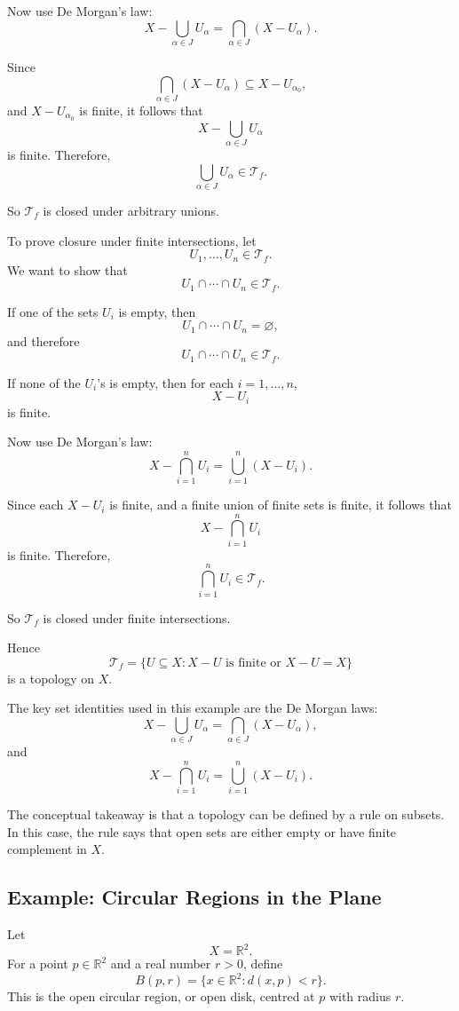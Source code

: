 \documentclass{article}
\begin{document}
	Now use De Morgan's law:
	\[
	X-\bigcup_{\alpha\in J}U_\alpha
	=
	\bigcap_{\alpha\in J}(X-U_\alpha).
	\]
	
	Since
	\[
	\bigcap_{\alpha\in J}(X-U_\alpha)
	\subseteq
	X-U_{\alpha_0},
	\]
	and \(X-U_{\alpha_0}\) is finite, it follows that
	\[
	X-\bigcup_{\alpha\in J}U_\alpha
	\]
	is finite. Therefore,
	\[
	\bigcup_{\alpha\in J}U_\alpha\in\mathcal T_f.
	\]
	
	So \(\mathcal T_f\) is closed under arbitrary unions.
	
	To prove closure under finite intersections, let
	\[
	U_1,\dots,U_n\in\mathcal T_f.
	\]
	We want to show that
	\[
	U_1\cap\cdots\cap U_n\in\mathcal T_f.
	\]
	
	If one of the sets \(U_i\) is empty, then
	\[
	U_1\cap\cdots\cap U_n=\varnothing,
	\]
	and therefore
	\[
	U_1\cap\cdots\cap U_n\in\mathcal T_f.
	\]
	
	If none of the \(U_i\)'s is empty, then for each \(i=1,\dots,n\),
	\[
	X-U_i
	\]
	is finite.
	
	Now use De Morgan's law:
	\[
	X-\bigcap_{i=1}^{n}U_i
	=
	\bigcup_{i=1}^{n}(X-U_i).
	\]
	
	Since each \(X-U_i\) is finite, and a finite union of finite sets is finite, it follows that
	\[
	X-\bigcap_{i=1}^{n}U_i
	\]
	is finite. Therefore,
	\[
	\bigcap_{i=1}^{n}U_i\in\mathcal T_f.
	\]
	
	So \(\mathcal T_f\) is closed under finite intersections.
	
	Hence
	\[
	\mathcal T_f
	=
	\{U\subseteq X:X-U\text{ is finite or }X-U=X\}
	\]
	is a topology on \(X\).
	
	The key set identities used in this example are the De Morgan laws:
	\[
	X-\bigcup_{\alpha\in J}U_\alpha
	=
	\bigcap_{\alpha\in J}(X-U_\alpha),
	\]
	and
	\[
	X-\bigcap_{i=1}^{n}U_i
	=
	\bigcup_{i=1}^{n}(X-U_i).
	\]
	
	The conceptual takeaway is that a topology can be defined by a rule on subsets. In this case, the rule says that open sets are either empty or have finite complement in \(X\).
	
	\subsection{Example: Circular Regions in the Plane}
	
	Let
	\[
	X=\mathbb R^2.
	\]
	For a point \(p\in\mathbb R^2\) and a real number \(r>0\), define
	\[
	B(p,r)=\{x\in\mathbb R^2:d(x,p)<r\}.
	\]
	This is the open circular region, or open disk, centred at \(p\) with radius \(r\).
	
\end{document}
